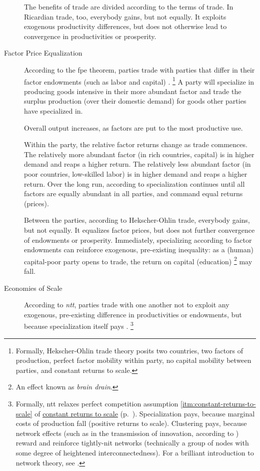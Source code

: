 \begin{description}
	The benefits of trade are divided according to the terms of trade.
	In Ricardian trade, too, everybody gains, but not equally.
	It exploits exogenous productivity differences, but does not otherwise lead to convergence in productivities or prosperity.


	\item[Factor Price Equalization]
	\label{itm:FPE}
	According to the \gls{fpe} theorem, parties trade with parties that differ in their factor endowments (such as labor and capital) \citep{Stolper1941}.
	\footnote{
		Formally, Hekscher-Ohlin trade theory posits two countries, two factors of production, perfect factor mobility within party, no capital mobility between parties, and constant returns to scale.
	}
	A party will specialize in producing goods intensive in their more abundant factor and trade the surplus production (over their domestic demand) for goods other parties have specialized in.

	Overall output increases, as factors are put to the most productive use.

	Within the party, the relative factor returns change as trade commences.
	The relatively more abundant factor (in rich countries, capital) is in higher demand and reaps a higher return.
	The relatively less abundant factor (in poor countries, low-skilled labor) is in higher demand and reaps a higher return.
	Over the long run, according to \cite{Stolper1941} specialization continues until all factors are equally abundant in all parties, and command equal returns (prices).

	Between the parties, according to Hekscher-Ohlin trade, everybody gains, but not equally.
	It equalizes factor prices, but does not further convergence of endowments or prosperity.
	Immediately, specializing according to factor endowments can reinforce exogenous, pre-existing inequality:
	as a (human) capital-poor party opens to trade, the return on capital (education)
	\footnote{
		An effect known as \emph{brain drain}.
	}
	may fall.

	\item[Economies of Scale]
	\label{itm:NTT}
	According to \emph{\gls{ntt}}, parties trade with one another not to exploit any exogenous, pre-existing difference in productivities or endowments, but because specialization itself pays \citep{Krugman-1980-aa}.
	\footnote{
		Formally, \gls{ntt} relaxes perfect competition assumption \ref{itm:constant-returns-to-scale} of \hyperref[itm:constant-returns-to-scale]{constant returns to scale} (p.~\pageref{itm:constant-returns-to-scale}).
		Specialization pays, because marginal costs of production fall (positive returns to scale).
		Clustering pays, because network effects (such as in the transmission of innovation, according to \citealt{Bass1969}) reward and reinforce tightly-nit networks (technically a group of nodes with some degree of heightened interconnectedness).
		For a brilliant introduction to network theory, see \cite{Kleinberg-2009-oz}.
	}


\end{description}

